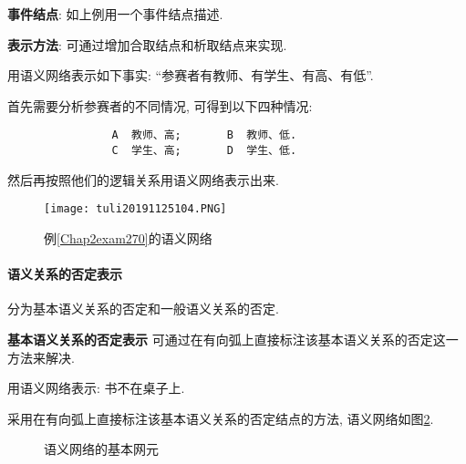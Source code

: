 \textbf{事件结点}: 如上例用一个事件结点描述.

\textbf{表示方法}: 可通过增加合取结点和析取结点来实现.
\begin{example}\label{Chap2exam270}
用语义网络表示如下事实: “参赛者有教师、有学生、有高、有低”.
\end{example}
首先需要分析参赛者的不同情况, 可得到以下四种情况:
\begin{center}
\begin{Verbatim}
                A  教师、高;       B  教师、低.
                C  学生、高;       D  学生、低.
\end{Verbatim}
\end{center}
然后再按照他们的逻辑关系用语义网络表示出来.
\begin{figure}[H]
\centering
\texttt{[image: tuli20191125104.PNG]}
\caption{例\ref{Chap2exam270}的语义网络}
\label{AI32fig104}
\end{figure}
\paragraph{语义关系的否定表示}
    分为基本语义关系的否定和一般语义关系的否定. 
    
 \textbf{基本语义关系的否定表示} 可通过在有向弧上直接标注该基本语义关系的否定这一方法来解决.

\begin{example}
用语义网络表示: 书不在桌子上.
\end{example}
采用在有向弧上直接标注该基本语义关系的否定结点的方法, 语义网络如图\ref{AI32fig00105}.
\begin{figure}[H]
\begin{center}
\caption{语义网络的基本网元}
\label{AI32fig00105}
\end{center}
\end{figure}

